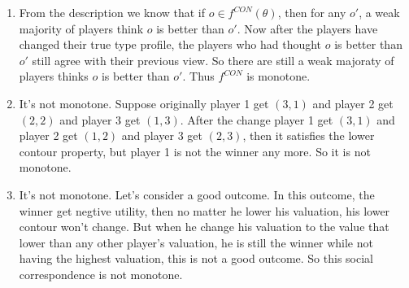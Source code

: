 \documentclass[12pt]{cgtmd}
\begin{document}

\begin{enumerate}
    \item From the description we know that if $o \in f^{CON}(\theta)$, then for any $o'$, a weak majority of players think $o$ is better than $o'$. Now after the players have changed their true type profile, the players who had thought $o$ is better than $o'$ still agree with their previous view. So there are still a weak majoraty of players thinks $o$ is better than $o'$. Thus $f^{CON}$ is monotone.
    \item It's not monotone. Suppose originally player 1 get $(3, 1)$ and player 2 get $(2, 2)$ and player 3 get $(1, 3)$. After the change player 1 get $(3, 1)$ and player 2 get $(1, 2)$ and player 3 get $(2, 3)$, then it satisfies the lower contour property, but player 1 is not the winner any more. So it is not monotone.
    \item It's not monotone. Let's consider a good outcome. In this outcome, the winner get negtive utility, then no matter he lower his valuation, his lower contour won't change. But when he change his valuation to the value that lower than any other player's valuation, he is still the winner while not having the highest valuation, this is not a good outcome. So this social correspondence is not monotone.
\end{enumerate}
\end{document}
